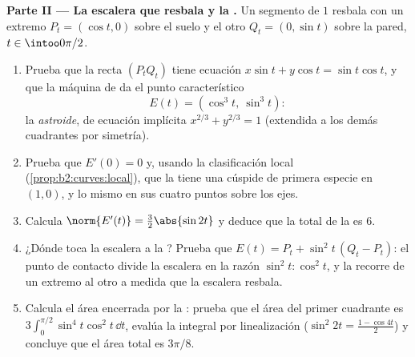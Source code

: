 \begin{problem}
\medskip
\noindent\textbf{Parte II --- La escalera que resbala y la
.} Un segmento de  $1$ resbala con un extremo $P_t =
(\cos t, 0)$ sobre el suelo y el otro $Q_t = (0, \sin t)$ sobre la
pared, $t \in \intoo0{\pi/2}$.
\begin{enumerate}[resume]
  \item Prueba que la recta $(P_tQ_t)$ tiene ecuación $x\sin t +
        y\cos t = \sin t\cos t$, y que la máquina de  da
        el punto característico
        \[
        E(t) = (\cos^3 t,\ \sin^3 t) :
        \]
        la \emph{astroide}, de ecuación implícita
        $x^{2/3} + y^{2/3} = 1$ (extendida a los demás cuadrantes
        por simetría).
  \item Prueba que $E'(0) = 0$ y, usando la clasificación local
        (\cref{prop:b2:curves:local}), que la  tiene una
        cúspide de primera especie en $(1, 0)$, y lo mismo en sus
        cuatro puntos sobre los ejes.
  \item Calcula $\norm{E'(t)} = \tfrac32\abs{\sin 2t}$ y deduce que
        la  total de la  es $6$.
  \item ¿Dónde toca la escalera a la ? Prueba que $E(t) =
        P_t + \sin^2 t\,(Q_t - P_t)$: el punto de contacto divide la
        escalera en la razón $\sin^2 t : \cos^2 t$, y la recorre de
        un extremo al otro a medida que la escalera resbala.
  \item Calcula el área encerrada por la : prueba que el
        área del primer cuadrante es $3\int_0^{\pi/2}\sin^4 t\cos^2
        t\,\dd t$, evalúa la integral por linealización ($\sin^2 2t
        = \tfrac{1 - \cos 4t}2$) y concluye que el área total es
        $3\pi/8$.
\end{enumerate}


\end{problem}

